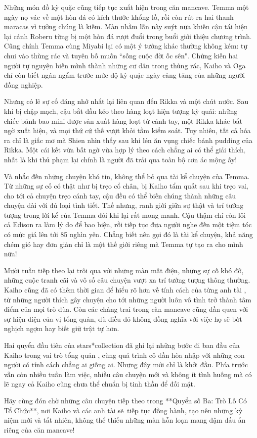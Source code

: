\documentclass[main.tex]{subfiles}
\begin{document}
Những món đồ kỳ quặc cũng tiếp tục xuất hiện trong căn mancave. Temma một ngày nọ vác về một hòn đá có kích thước khổng lồ, rồi còn rút ra hai thanh maracas vì tưởng chúng là kiếm. Màn nhầm lẫn này suýt nữa khiến cậu tái hiện lại cảnh Roberu từng bị một hòn đá rượt đuổi trong buổi giới thiệu chương trình. Cũng chính Temma cùng Miyabi lại có một ý tưởng khác thường không kém: tự chui vào thùng rác và tuyên bố muốn ``sống cuộc đời ốc sên". Chứng kiến hai người tự nguyện biến mình thành những cư dân trong thùng rác, Kaiho và Oga chỉ còn biết ngán ngẩm trước mức độ kỳ quặc ngày càng tăng của những người đồng nghiệp.

Nhưng có lẽ sự cố đáng nhớ nhất lại liên quan đến Rikka và một chút nước. Sau khi bị chập mạch, cậu bắt đầu kéo theo hàng loạt hiện tượng kỳ quái: những chiếc bánh bao mini được sản xuất hàng loạt từ cánh tay, một Rikka khác bất ngờ xuất hiện, và mọi thứ cứ thế vượt khỏi tầm kiểm soát. Tuy nhiên, tất cả hóa ra chỉ là giấc mơ mà Shien nhìn thấy sau khi lén ăn vụng chiếc bánh pudding của Rikka. Một cái kết vừa bất ngờ vừa hợp lý theo cách chẳng ai có thể giải thích, nhất là khi thủ phạm lại chính là người đã trải qua toàn bộ cơn ác mộng ấy!

Và nhắc đến những chuyện khó tin, không thể bỏ qua tài kể chuyện của Temma. Từ những sự cố có thật như bị trẹo cổ chân, bị Kaiho tẩm quất sau khi trẹo vai, cho tới cả chuyện trẹo cánh tay, cậu đều có thể biến chúng thành những câu chuyện dài với đủ loại tình tiết. Thế nhưng, ranh giới giữa sự thật và trí tưởng tượng trong lời kể của Temma đôi khi lại rất mong manh. Cậu thậm chí còn lôi cả Edison ra làm lý do để bao biện, rồi tiếp tục đưa người nghe đến một tiệm tóc có mức giá lên tới 85 nghìn yên. Chẳng biết nên gọi đó là tài kể chuyện, khả năng chém gió hay đơn giản chỉ là một thế giới riêng mà Temma tự tạo ra cho mình nữa!

Mười tuần tiếp theo lại trôi qua với những màn mất điện, những sự cố khó đỡ, những cuộc tranh cãi và vô số câu chuyện vượt xa trí tưởng tượng thông thường. Kaiho cũng đã có thêm thời gian để hiểu rõ hơn về tính cách của từng anh tài \hls, từ những người thích gây chuyện cho tới những người luôn vô tình trở thành tâm điểm của mọi trò đùa. Còn các chàng trai trong căn mancave cũng dần quen với sự hiện diện của vị tổng quản, dù điều đó không đồng nghĩa với việc họ sẽ bớt nghịch ngợm hay biết giữ trật tự hơn.

Hai quyển đầu tiên của stars*collection đã ghi lại những bước đi ban đầu của Kaiho trong vai trò tổng quản \hls, cùng quá trình cô dần hòa nhập với những con người có tính cách chẳng ai giống ai. Nhưng đây mới chỉ là khởi đầu. Phía trước vẫn còn nhiều tuần làm việc, nhiều câu chuyện mới và không ít tình huống mà có lẽ ngay cả Kaiho cũng chưa thể chuẩn bị tinh thần để đối mặt.

Hãy cùng đón chờ những câu chuyện tiếp theo trong **Quyển số Ba: Trò Lố Có Tổ Chức**, nơi Kaiho và các anh tài \hls sẽ\ tiếp tục đồng hành, tạo nên những kỷ niệm mới và tất nhiên, không thể thiếu những màn hỗn loạn mang đậm dấu ấn riêng của căn mancave!
\end{document}
